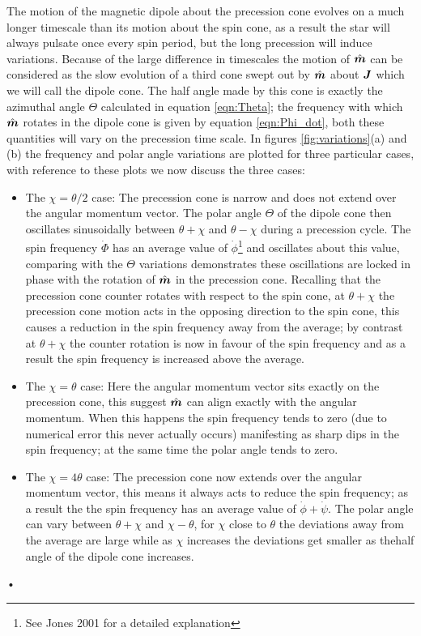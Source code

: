 \documentclass[11pt]{article}
\numberwithin{equation}{section}
\numberwithin{figure}{section}
\numberwithin{table}{section}
\begin{document}
The motion of the magnetic dipole about the precession cone evolves on a much longer timescale than its motion about the spin cone, as a result the star will always pulsate once every spin period, but the long precession will induce variations.  Because of the large difference in timescales the motion of $\hat{\boldsymbol{m}}$ can be considered as the slow evolution of a third cone swept out by $\hat{\boldsymbol{m}}$ about $\boldsymbol{J}$ which we will call the dipole cone. The half angle made by this cone is exactly the azimuthal angle $\Theta$ calculated in equation \eqref{eqn:Theta}; the frequency with which $\hat{\boldsymbol{m}}$ rotates in the dipole cone is given by equation \eqref{eqn:Phi_dot}, both these quantities will vary on the precession time scale. In figures \ref{fig:variations}(a) and (b) the frequency and polar angle variations are plotted for three particular cases, with reference to these plots we now discuss the three cases:
\begin{itemize}
\item The $\chi = \theta/2$ case: The precession cone is narrow and does not extend over the angular momentum vector. The polar angle $\Theta$ of the dipole cone then oscillates sinusoidally between $\theta+\chi$ and $\theta-\chi$ during a precession cycle. The spin frequency $\dot{\Phi}$ has an average value of $\dot{\phi}$\footnote{See Jones 2001 for a detailed explanation} and oscillates about this value, comparing with the $\Theta$ variations demonstrates these oscillations are locked in phase with the rotation of $\hat{\boldsymbol{m}}$ in the precession cone. Recalling that the precession cone counter rotates with respect to the spin cone, at $\theta+\chi$ the precession cone motion acts in the opposing direction to the spin cone, this causes a reduction in the spin frequency away from the average; by contrast at $\theta+\chi$ the counter rotation is now in favour of the spin frequency and as a result the spin frequency is increased above the average.

\item The $\chi = \theta$ case: Here the angular momentum vector sits exactly on the precession cone, this suggest $\hat{\boldsymbol{m}}$ can align exactly with the angular momentum. When this happens the spin frequency tends to zero (due to numerical error this never actually occurs) manifesting as sharp dips in the spin frequency; at the same time the polar angle tends to zero.

\item The $\chi = 4\theta$ case: The precession cone now extends over the angular momentum vector, this means it always acts to reduce the spin frequency; as a result the the spin frequency has an average value of $\dot{\phi} + \dot{\psi}$. The polar angle can vary between $\theta+\chi$ and $\chi-\theta$, for $\chi$ close to $\theta$ the deviations away from the average are large while as $\chi$ increases the deviations get smaller as thehalf angle of the dipole cone increases.
\end{itemize}•
\end{document}
